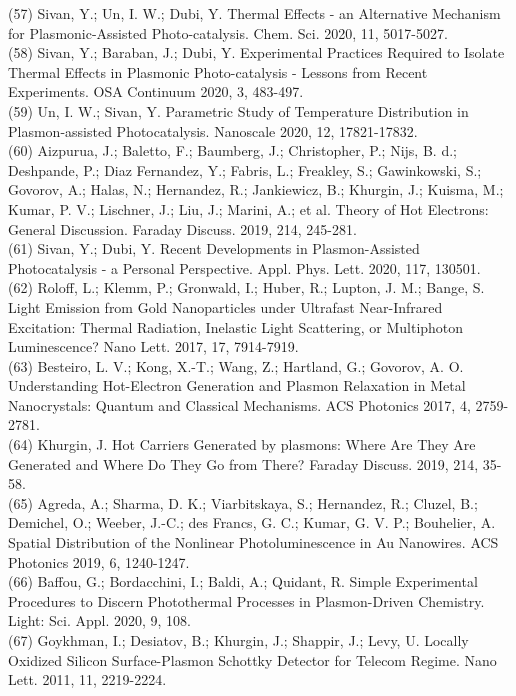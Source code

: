 \documentclass[10pt]{article}
\begin{document}
(57) Sivan, Y.; Un, I. W.; Dubi, Y. Thermal Effects - an Alternative Mechanism for Plasmonic-Assisted Photo-catalysis. Chem. Sci. 2020, 11, 5017-5027.\\
(58) Sivan, Y.; Baraban, J.; Dubi, Y. Experimental Practices Required to Isolate Thermal Effects in Plasmonic Photo-catalysis - Lessons from Recent Experiments. OSA Continuum 2020, 3, 483-497.\\
(59) Un, I. W.; Sivan, Y. Parametric Study of Temperature Distribution in Plasmon-assisted Photocatalysis. Nanoscale 2020, 12, 17821-17832.\\
(60) Aizpurua, J.; Baletto, F.; Baumberg, J.; Christopher, P.; Nijs, B. d.; Deshpande, P.; Diaz Fernandez, Y.; Fabris, L.; Freakley, S.; Gawinkowski, S.; Govorov, A.; Halas, N.; Hernandez, R.; Jankiewicz, B.; Khurgin, J.; Kuisma, M.; Kumar, P. V.; Lischner, J.; Liu, J.; Marini, A.; et al. Theory of Hot Electrons: General Discussion. Faraday Discuss. 2019, 214, 245-281.\\
(61) Sivan, Y.; Dubi, Y. Recent Developments in Plasmon-Assisted Photocatalysis - a Personal Perspective. Appl. Phys. Lett. 2020, 117, 130501.\\
(62) Roloff, L.; Klemm, P.; Gronwald, I.; Huber, R.; Lupton, J. M.; Bange, S. Light Emission from Gold Nanoparticles under Ultrafast Near-Infrared Excitation: Thermal Radiation, Inelastic Light Scattering, or Multiphoton Luminescence? Nano Lett. 2017, 17, 7914-7919.\\
(63) Besteiro, L. V.; Kong, X.-T.; Wang, Z.; Hartland, G.; Govorov, A. O. Understanding Hot-Electron Generation and Plasmon Relaxation in Metal Nanocrystals: Quantum and Classical Mechanisms. ACS Photonics 2017, 4, 2759-2781.\\
(64) Khurgin, J. Hot Carriers Generated by plasmons: Where Are They Are Generated and Where Do They Go from There? Faraday Discuss. 2019, 214, 35-58.\\
(65) Agreda, A.; Sharma, D. K.; Viarbitskaya, S.; Hernandez, R.; Cluzel, B.; Demichel, O.; Weeber, J.-C.; des Francs, G. C.; Kumar, G. V. P.; Bouhelier, A. Spatial Distribution of the Nonlinear Photoluminescence in Au Nanowires. ACS Photonics 2019, 6, 1240-1247.\\
(66) Baffou, G.; Bordacchini, I.; Baldi, A.; Quidant, R. Simple Experimental Procedures to Discern Photothermal Processes in Plasmon-Driven Chemistry. Light: Sci. Appl. 2020, 9, 108.\\
(67) Goykhman, I.; Desiatov, B.; Khurgin, J.; Shappir, J.; Levy, U. Locally Oxidized Silicon Surface-Plasmon Schottky Detector for Telecom Regime. Nano Lett. 2011, 11, 2219-2224.\\
\end{document}
